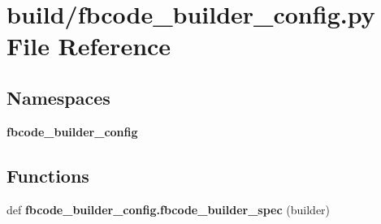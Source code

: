 \section{build/fbcode\+\_\+builder\+\_\+config.py File Reference}
\label{fbcode__builder__config_8py}
\subsection*{Namespaces}
\begin{DoxyCompactItemize}
\item 
 {\bf fbcode\+\_\+builder\+\_\+config}
\end{DoxyCompactItemize}
\subsection*{Functions}
\begin{DoxyCompactItemize}
\item 
def {\bf fbcode\+\_\+builder\+\_\+config.\+fbcode\+\_\+builder\+\_\+spec} (builder)
\end{DoxyCompactItemize}
